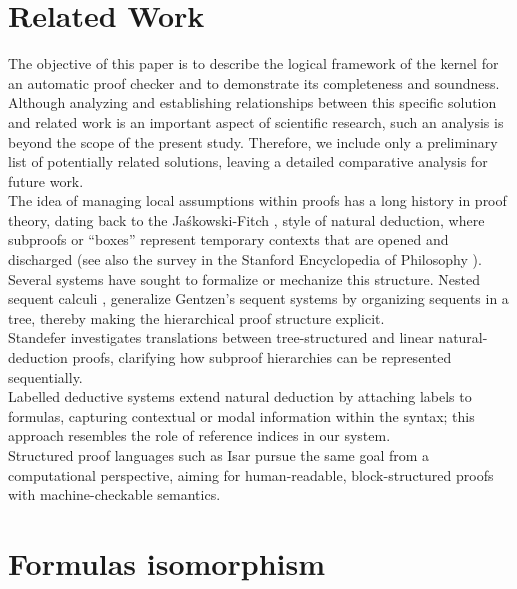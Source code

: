 \documentclass[10pt]{article}
\theoremstyle{plain}
\begin{document}
\section{Related Work}
\label{related}
The objective of this paper is to describe the logical framework of the kernel for an automatic proof checker and to demonstrate its completeness and soundness. Although analyzing and establishing relationships between this specific solution and related work is an important aspect of scientific research, such an analysis is beyond the scope of the present study. Therefore, we include only a preliminary list of potentially related solutions, leaving a detailed comparative analysis for future work. 
\\

The idea of managing local assumptions within proofs has a long history in proof theory, dating back to the Jaśkowski-Fitch \cite{fitch1966}, \cite{jaskowski1934} style of natural deduction, where subproofs or “boxes” represent temporary contexts that are opened and discharged (see also the survey in the Stanford Encyclopedia of Philosophy \cite{sepND}).
\\ 

Several systems have sought to formalize or mechanize this structure. Nested sequent calculi \cite{brunnler2010}, \cite{fitch1966} generalize Gentzen's sequent systems by organizing sequents in a tree, thereby making the hierarchical proof structure explicit.
\\ 

Standefer \cite{standefer2019} investigates translations between tree-structured and linear natural-deduction proofs, clarifying how subproof hierarchies can be represented sequentially. 
\\

Labelled deductive systems \cite{broda2004} extend natural deduction by attaching labels to formulas, capturing contextual or modal information within the syntax; this approach resembles the role of reference indices in our system. 
\\

Structured proof languages such as Isar \cite{wenzel2002} pursue the same goal from a computational perspective, aiming for human-readable, block-structured proofs with machine-checkable semantics.
\\

\appendix

\section{Formulas isomorphism}
\end{document}
